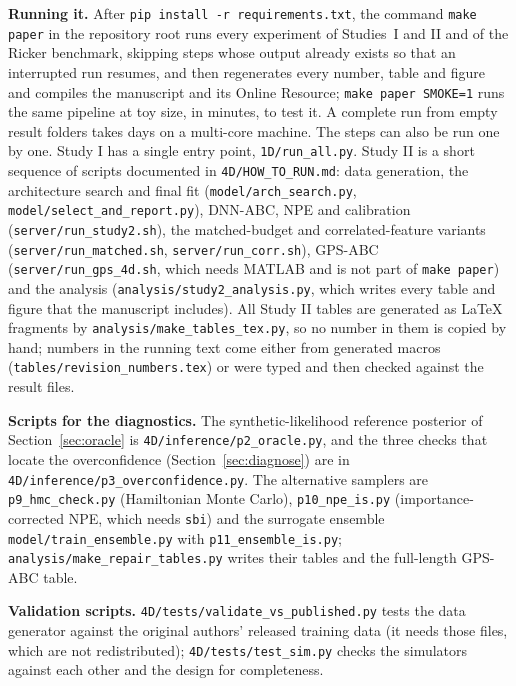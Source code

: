 \documentclass[sn-basic,iicol,pdflatex]{sn-jnl}
\begin{document}
\noindent\textbf{Running it.} After \texttt{pip install -r requirements.txt}, the command \texttt{make paper} in the repository root runs every experiment of Studies~I and II and of the Ricker benchmark, skipping steps whose output already exists so that an interrupted run resumes, and then regenerates every number, table and figure and compiles the manuscript and its Online Resource; \texttt{make paper SMOKE=1} runs the same pipeline at toy size, in minutes, to test it. A complete run from empty result folders takes days on a multi-core machine. The steps can also be run one by one. Study I has a single entry point, \texttt{1D/run\_all.py}. Study II is a short sequence of
scripts documented in \texttt{4D/HOW\_TO\_RUN.md}: data generation, the architecture search and final fit (\texttt{model/arch\_search.py}, \texttt{model/select\_and\_report.py}), DNN-ABC,
NPE and calibration (\texttt{server/run\_study2.sh}), the matched-budget and correlated-feature variants
(\texttt{server/run\_matched.sh}, \texttt{server/run\_corr.sh}), GPS-ABC (\texttt{server/run\_gps\_4d.sh}, which needs MATLAB and is not part of \texttt{make paper}) and the analysis
(\texttt{analysis/study2\_analysis.py}, which writes every table and figure that the manuscript includes).
All Study II tables are generated as \LaTeX{} fragments by \texttt{analysis/make\_tables\_tex.py}, so no number in them is copied by hand; numbers in the running text come either from generated macros (\texttt{tables/revision\_numbers.tex}) or were typed and then checked against the result files.

\noindent\textbf{Scripts for the diagnostics.} The synthetic-likelihood reference posterior of Section~\ref{sec:oracle} is \texttt{4D/inference/p2\_oracle.py}, and the three checks that locate the overconfidence (Section~\ref{sec:diagnose}) are in \texttt{4D/inference/p3\_overconfidence.py}. The alternative samplers are \texttt{p9\_hmc\_check.py} (Hamiltonian Monte Carlo), \texttt{p10\_npe\_is.py} (importance-corrected NPE, which needs \texttt{sbi}) and the surrogate ensemble \texttt{model/train\_ensemble.py} with \texttt{p11\_ensemble\_is.py}; \texttt{analysis/make\_repair\_tables.py} writes their tables and the full-length GPS-ABC table.

\noindent\textbf{Validation scripts.} \texttt{4D/tests/validate\_vs\_published.py} tests the data generator against the original
authors' released training data (it needs those files, which are not redistributed);
\texttt{4D/tests/test\_sim.py} checks the simulators against each other and the design for completeness.
\end{document}
